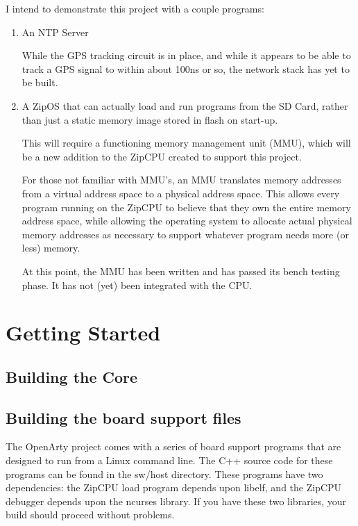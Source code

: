\documentclass{gqtekspec}
\begin{document}
I intend to demonstrate this project with a couple programs:
\begin{enumerate}
\item An NTP Server

	While the GPS tracking circuit is in place, and while it appears to be
	able to track a GPS signal to within about 100ns or so, the 
	network stack has yet to be built.

\item A ZipOS that can actually load and run programs from the SD Card, rather
	than just a static memory image stored in flash on start-up.

	This will require a functioning memory management unit (MMU), which
	will be a new addition to the ZipCPU created to support this project.

	For those not familiar with MMU's, an MMU translates memory addresses
	from a virtual address space to a physical address space.  This allows
	every program running on the ZipCPU to believe that they own the entire
	memory address space, while allowing the operating system to allocate
	actual physical memory addresses as necessary to support whatever
	program needs more (or less) memory.

	At this point, the MMU has been written and has passed its bench
	testing phase.  It has not (yet) been integrated with the CPU.
\end{enumerate}


\chapter{Getting Started}\label{ch:getting-started}
\section{Building the Core}
%
\section{Building the board support files}
The OpenArty project comes with a series of board support programs that are
designed to run from a Linux command line.  The C++ source code for these
programs can be found in the sw/host directory.  These programs have two
dependencies: the ZipCPU load program depends upon libelf, and the ZipCPU
debugger depends upon the ncurses library.  If you have these two libraries,
your build should proceed without problems.

\end{document}
